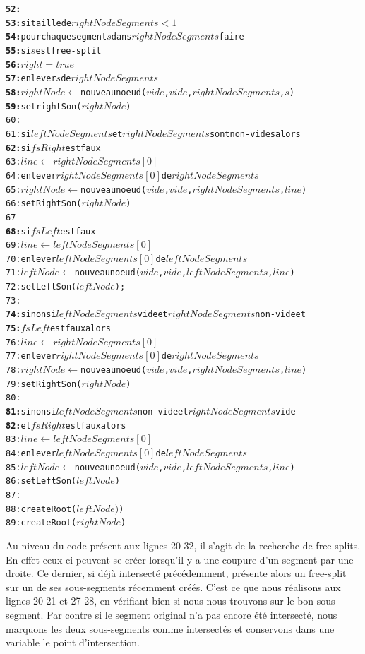 \documentclass[11pt,a4paper]{article}
\theoremstyle{definition}
\theoremstyle{remark}
\begin{document}
\begin{alltt}
\textbf{52:}            
\textbf{53:}    si taille de \(rightNodeSegments < 1\)
\textbf{54:}      pour chaque segment \(s\) dans \(rightNodeSegments\) faire
\textbf{55:}        si \(s\) est free-split
\textbf{56:}          \(right = true\)
\textbf{57:}          enlever \(s\) de \(rightNodeSegments\)
\textbf{58:}          \(rightNode \leftarrow \) nouveau noeud (\(vide\), \(vide\), \(rightNodeSegments\), \(s\))
\textbf{59:}          setrightSon(\(rightNode\))
60:
61:   si \(leftNodeSegments\) et \(rightNodeSegments\) sont non-vides alors
\textbf{62:}	    si \(fsRight\) est faux
63:       \(line \leftarrow rightNodeSegments[0]\)
64:       enlever \(rightNodeSegments[0]\) de \(rightNodeSegments\)
65:       \(rightNode \leftarrow\) nouveau noeud (\(vide\), \(vide\), \(rightNodeSegments\), \(line\))
66:       setRightSon(\(rightNode\))
67
\textbf{68:}	    si \(fsLeft\) est faux
69:       \(line \leftarrow leftNodeSegments[0]\)
70:       enlever \(leftNodeSegments[0]\) de \(leftNodeSegments\)
71:       \(leftNode \leftarrow\) nouveau noeud (\(vide\), \(vide\), \(leftNodeSegments\), \(line\))
72:       setLeftSon(\(leftNode\));
73:     
\textbf{74:}   sinon si \(leftNodeSegments\) vide et \(rightNodeSegments\) non-vide et
\textbf{75:}   \(fsLeft\) est faux alors
76:     \(line \leftarrow rightNodeSegments[0]\)
77:     enlever \(rightNodeSegments[0]\) de \(rightNodeSegments\)
78:     \(rightNode \leftarrow \) nouveau noeud (\(vide\), \(vide\), \(rightNodeSegments\), \(line\))
79:     setRightSon(\(rightNode\))
80:    
\textbf{81:}   sinon si \(leftNodeSegments\) non-vide et \(rightNodeSegments\) vide 
\textbf{82:}   et \(fsRight\) est faux alors
83:     \(line \leftarrow leftNodeSegments[0]\)
84:     enlever \(leftNodeSegments[0]\) de \(leftNodeSegments\)
85:     \(leftNode \leftarrow \) nouveau noeud (\(vide\), \(vide\), \(leftNodeSegments\), \(line\))
86:     setLeftSon(\(leftNode\))
87:     
88:   createRoot(\(leftNode)\))
89:   createRoot(\(rightNode\))
\end{alltt}

Au niveau du code présent aux lignes 20-32, il s'agit de la recherche de free-splits. En effet ceux-ci peuvent se créer lorsqu'il y a une coupure d'un segment par une droite. Ce dernier, si déjà intersecté précédemment, présente alors un free-split sur un de ses sous-segments récemment créés. C'est ce que nous réalisons aux lignes 20-21 et 27-28, en vérifiant bien si nous nous trouvons sur le bon sous-segment. Par contre si le segment original n'a pas encore été intersecté, nous marquons les deux sous-segments comme intersectés et conservons dans une variable le point d'intersection. \\
\end{document}
